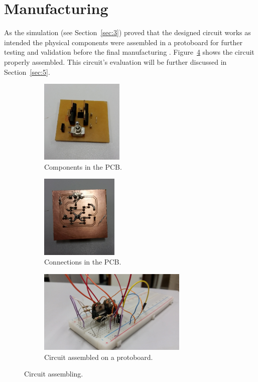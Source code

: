 \section{\textbf{Manufacturing}}\label{sec:4}

	As the simulation (see Section~\ref{sec:3}) proved that the designed circuit works as intended the physical components were assembled in a protoboard for further testing and validation before the final manufacturing . Figure~\ref{fig:proto_h} shows the circuit properly assembled. This circuit's evaluation will be further discussed in Section~\ref{sec:5}.
	
	
	
\begin{figure}
\centering

\begin{subfigure}{.45\columnwidth}
\includegraphics[height=4cm]{img/compontentes4.jpg}
\caption{Components in the PCB.}
\label{fig:pcb_top}
\end{subfigure}
\begin{subfigure}{.45\columnwidth}
\centering
\includegraphics[height=4cm]{img/solda_ja_saiu_da_jaula.jpg}
\caption{Connections in the PCB.}
\label{fig:pcb_bot}
\end{subfigure}
\begin{subfigure}{\columnwidth}
\centering
\includegraphics[height=4cm]{img/h_bridge_proto_close.jpg}
\caption{Circuit assembled on a protoboard.}
\label{fig:proto_h}
\end{subfigure}
\caption{Circuit assembling.}
\end{figure}